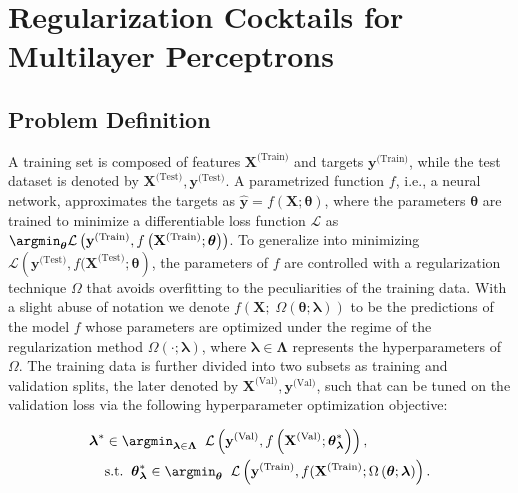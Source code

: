 \section{Regularization Cocktails for Multilayer Perceptrons}
\label{sec:proposedmethod}

\subsection{Problem Definition}

A training set is composed of features \mbox{$\mathbf{X}^{\text{(Train)}}$} and targets $\mathbf{y}^{\text{(Train)}}$, while the test dataset is denoted by \mbox{$\mathbf{X}^{\text{(Test)}}, \mathbf{y}^{\text{(Test)}}$}. A parametrized function $f$, i.e., a neural network, approximates the targets as $\mathbf{\hat y} = f(\mathbf{X}; \boldsymbol{\theta})$, where the parameters $\boldsymbol{\theta}$ are trained to minimize a differentiable loss function $\mathcal{L}$ as $\argmin_{\boldsymbol{\theta}} \mathcal{L}\left(\mathbf{y}^{\text{(Train)}}, f\left(\mathbf{X}^{\text{(Train)}}; \boldsymbol{\theta}\right) \right)$. To generalize into minimizing $\mathcal{L}\left(\mathbf{y}^{\text{(Test)}}, f(\mathbf{X}^{\text{(Test)}}; \boldsymbol{\theta}\right)$, the parameters of $f$ are controlled with a regularization technique $\Omega$ that avoids overfitting to the peculiarities of the training data. With a slight abuse of notation we denote $f\left(\mathbf{X}; \; \Omega\left(\boldsymbol{\theta}; \boldsymbol{\lambda}\right) \right)$ to be the predictions of the model $f$ whose parameters \boldsymbol{$\theta$} are optimized under the regime of the regularization method $\Omega(\cdot; \boldsymbol{\lambda})$, where $\boldsymbol{\lambda} \in \boldsymbol{\Lambda}$ represents the hyperparameters of $\Omega$. The training data is further divided into two subsets as training and validation splits, the later denoted by $\mathbf{X}^{\text{(Val)}}, \mathbf{y}^{\text{(Val)}}$, such that \boldsymbol{$\lambda$} can be tuned on the validation loss via the following hyperparameter optimization objective:

\begin{align}
\label{eq:hpo1}
\boldsymbol{\lambda}^* &\in \argmin_{\boldsymbol{\lambda} \in \boldsymbol{\Lambda}} \;\;  \mathcal{L}\left(\mathbf{y}^{\text{(Val)}}, f\left(\mathbf{X}^{\text{(Val)}}; \boldsymbol{\theta}^{*}_{\boldsymbol{\lambda}} \right) \right), \;\; \\ \nonumber
&\text{s.t.}\;\; \boldsymbol{\theta}^{*}_{\boldsymbol{\lambda}} \in \argmin_{\boldsymbol{\theta}} \;\; \mathcal{L}\left(\mathbf{y}^{\text{(Train)}}, f(\mathbf{X}^{\text{(Train)}}; \Omega\left(\boldsymbol{\theta}; \boldsymbol{\lambda}\right) \right).
\end{align}

